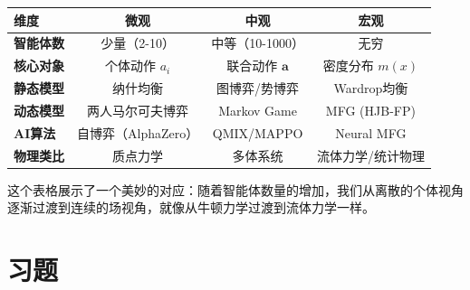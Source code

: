 \begin{unification}[title=从微观到宏观的统一视角]
\begin{center}
\small
\setlength{\tabcolsep}{4pt}
\begin{tabular}{lccc}
\toprule
\textbf{维度} & \textbf{微观} & \textbf{中观} & \textbf{宏观} \\
\midrule
\textbf{智能体数} & 少量（2-10） & 中等（10-1000） & 无穷 \\
\textbf{核心对象} & 个体动作 $a_i$ & 联合动作 $\mathbf{a}$ & 密度分布 $m(x)$ \\
\textbf{静态模型} & 纳什均衡 & 图博弈/势博弈 & Wardrop均衡 \\
\textbf{动态模型} & 两人马尔可夫博弈 & Markov Game & MFG (HJB-FP) \\
\textbf{AI算法} & 自博弈（AlphaZero） & QMIX/MAPPO & Neural MFG \\
\textbf{物理类比} & 质点力学 & 多体系统 & 流体力学/统计物理 \\
\bottomrule
\end{tabular}
\end{center}

这个表格展示了一个美妙的对应：随着智能体数量的增加，我们从离散的个体视角逐渐过渡到连续的场视角，就像从牛顿力学过渡到流体力学一样。
\end{unification}

\section{习题}

